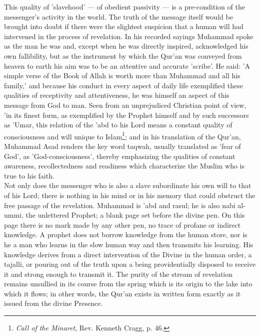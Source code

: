 \documentclass[11pt, b5paper, twoside]{book}
\begin{document}
This quality of 'slavehood' --- of obedient passivity --- is a pre-condition of the messenger's activity 
in the world. The truth of the message itself would be brought into doubt if there were the slightest 
suspicion that a human will had intervened in the process of revelation. In his recorded sayings 
Muhammad spoke as the man he was and, except when he was directly inspired, acknowledged his own 
fallibility, but as the instrument by which the Qur'an was conveyed from heaven to earth his aim was 
to be an attentive and accurate 'scribe'. He said: 'A simple verse of the Book of Allah is worth more 
than Muhammad and all his family,' and because his conduct in every aspect of daily life exemplified 
these qualities of receptivity and attentiveness, he was himself an aspect of this message from God 
to man. Seen from an unprejudiced Christian point of view, 'in its finest form, as exemplified by the 
Prophet himself and by such successors as 'Umar, this relation of the 'abd to his Lord means a 
constant quality of consciousness and will unique to Islam\footnote{\emph{Call of the Minaret}, Rev. Kenneth Cragg, p. 46.}; and in his translation of the Qur'an, Muhammad Asad renders the key word taqwah, usually translated as 'fear of God', as 'God-consciousness', thereby emphasizing the qualities of constant awareness, recollectedness and readiness which characterize the Muslim who is true to his faith. \\

Not only does the messenger who is also a slave subordinate his own will to that of his Lord; there 
is nothing in his mind or in his memory that could obstruct the free passage of the revelation. 
Muhammad is 'abd and rasul; he is also nabi al-ummi, the unlettered Prophet; a blank page set before 
the divine pen. On this page there is no mark made by any other pen, no trace of profane or indirect 
knowledge. A prophet does not borrow knowledge from the human store, nor is he a man who learns in 
the slow human way and then transmits his learning. His knowledge derives from a direct intervention 
of the Divine in the human order, a tajalli, or pouring out of the truth upon a being providentially 
disposed to receive it and strong enough to transmit it. The purity of the stream of revelation 
remains unsullied in its course from the spring which is its origin to the lake into which it flows; 
in other words, the Qur'an exists in written form exactly as it issued from the divine Presence. \\
\end{document}
